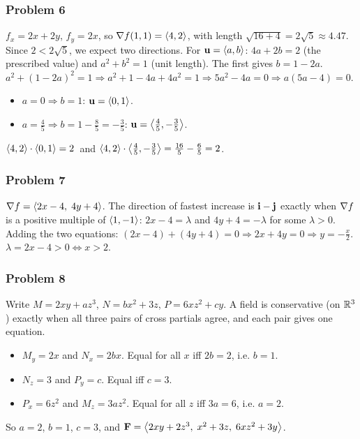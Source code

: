 
\subsubsection*{Problem 6}

 $f_x=2x+2y$, $f_y=2x$, so $\nabla f(1,1)=\left\langle 4,2 \right\rangle$, with length
$\sqrt{16+4}=2\sqrt5\approx4.47$. Since $2<2\sqrt5$, we expect two directions.
 For $\mathbf{u}=\left\langle a,b \right\rangle$: $4a+2b=2$ (the prescribed value) and $a^2+b^2=1$ (unit length).
The first gives $b=1-2a$.
$a^2+(1-2a)^2=1\Rightarrow a^2+1-4a+4a^2=1\Rightarrow5a^2-4a=0\Rightarrow a(5a-4)=0$.
\begin{itemize}
\item $a=0\Rightarrow b=1$: $\mathbf{u}=\left\langle 0,1 \right\rangle$.
\item $a=\frac45\Rightarrow b=1-\frac85=-\frac35$: $\mathbf{u}=\left\langle \frac45,-\frac35 \right\rangle$.
\end{itemize}
 $\left\langle 4,2 \right\rangle\cdot\left\langle 0,1 \right\rangle=2$\checkok\ and $\left\langle 4,2 \right\rangle\cdot\left\langle \frac45,-\frac35 \right\rangle=\frac{16}{5}-\frac65=2$\checkok.


\subsubsection*{Problem 7}

 $\nabla f=\left\langle 2x-4,\;4y+4 \right\rangle$.
 The direction of fastest increase is $\mathbf{i}-\mathbf{j}$ exactly when
$\nabla f$ is a positive multiple of $\left\langle 1,-1 \right\rangle$:
$2x-4=\lambda$ and $4y+4=-\lambda$ for some $\lambda>0$.
 Adding the two equations: $(2x-4)+(4y+4)=0\Rightarrow2x+4y=0\Rightarrow y=-\frac x2$.
 $\lambda=2x-4>0\iff x>2$.


\subsubsection*{Problem 8}

Write $M=2xy+az^3$, $N=bx^2+3z$, $P=6xz^2+cy$. A field is conservative (on $\mathbb{R}^3$) exactly when
all three pairs of cross partials agree, and each pair gives one equation.
\begin{itemize}
\item $M_y=2x$ and $N_x=2bx$. Equal for all $x$ iff $2b=2$, i.e. $b=1$.
\item $N_z=3$ and $P_y=c$. Equal iff $c=3$.
\item $P_x=6z^2$ and $M_z=3az^2$. Equal for all $z$ iff $3a=6$, i.e. $a=2$.
\end{itemize}
So $a=2$, $b=1$, $c=3$, and $\mathbf{F}=\left\langle 2xy+2z^3,\;x^2+3z,\;6xz^2+3y \right\rangle$.

